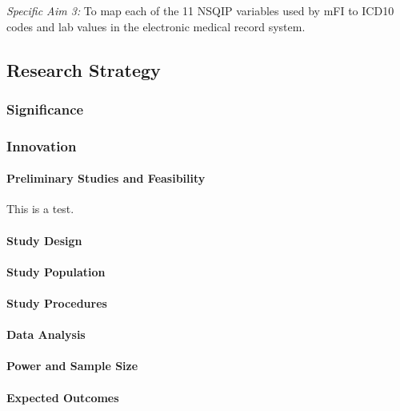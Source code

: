 \emph{Specific Aim 3:} To map each of the 11 NSQIP variables used by mFI to ICD10 codes and lab values in the electronic medical record system.


\subsection{Research Strategy}\label{research-strategy}


\subsubsection{Significance}\label{significance}

\subsubsection{Innovation}\label{innovation}

\paragraph{Preliminary Studies and Feasibility}\label{preliminary-studies-and-feasibility} This is a test.


\paragraph{Study Design}\label{study-design}


\paragraph{Study Population}\label{study-population}


\paragraph{Study Procedures}\label{study-procedures}


\paragraph{Data Analysis}\label{data-analysis}

\paragraph{Power and Sample Size}\label{power-and-sample-size}

\paragraph{Expected Outcomes}\label{expected-outcomes}

